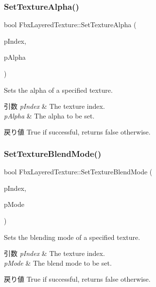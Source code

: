 \mbox{\label{class_fbx_layered_texture_a87145db35c3a207f5e54c9a9dcd83f1f}} 
\subsubsection{\texorpdfstring{Set\+Texture\+Alpha()}{SetTextureAlpha()}}
{\footnotesize\ttfamily bool Fbx\+Layered\+Texture\+::\+Set\+Texture\+Alpha (\begin{DoxyParamCaption}\item[{int}]{p\+Index,  }\item[{double}]{p\+Alpha }\end{DoxyParamCaption})}

Sets the alpha of a specified texture. 
\begin{DoxyParams}{引数}
{\em p\+Index} & The texture index. \\
\hline
{\em p\+Alpha} & The alpha to be set. \\
\hline
\end{DoxyParams}
\begin{DoxyReturn}{戻り値}
{\ttfamily True} if successful, returns {\ttfamily false} otherwise. 
\end{DoxyReturn}
\mbox{\label{class_fbx_layered_texture_ae16a157ad7ff41d377a2cff885a00c80}} 
\subsubsection{\texorpdfstring{Set\+Texture\+Blend\+Mode()}{SetTextureBlendMode()}}
{\footnotesize\ttfamily bool Fbx\+Layered\+Texture\+::\+Set\+Texture\+Blend\+Mode (\begin{DoxyParamCaption}\item[{int}]{p\+Index,  }\item[{\hyperlink{class_fbx_layered_texture_af291d42b0329513909d2ddf48f56f5ba}{E\+Blend\+Mode}}]{p\+Mode }\end{DoxyParamCaption})}

Sets the blending mode of a specified texture. 
\begin{DoxyParams}{引数}
{\em p\+Index} & The texture index. \\
\hline
{\em p\+Mode} & The blend mode to be set. \\
\hline
\end{DoxyParams}
\begin{DoxyReturn}{戻り値}
{\ttfamily True} if successful, returns {\ttfamily false} otherwise. 
\end{DoxyReturn}



